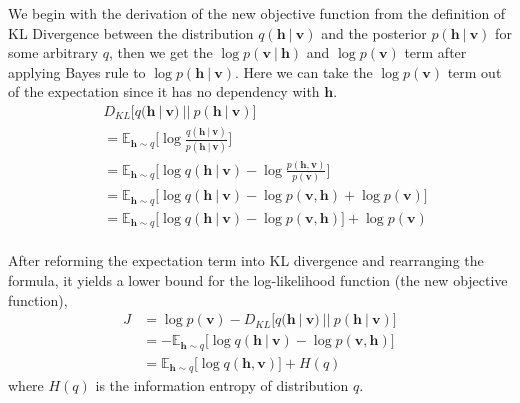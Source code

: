 \documentclass[conference]{IEEEtran}
\begin{document}
We begin with the derivation of the new objective function from the definition of KL Divergence between the distribution $q(\boldsymbol{h}\ |\ \boldsymbol{v})$ and the posterior $p(\boldsymbol{h}\ |\ \boldsymbol{v})$ for some arbitrary $q$, then we get the $\log p(\boldsymbol{v}\ |\ \boldsymbol{h})$ and $\log p(\boldsymbol{v})$ term after applying Bayes rule to $\log p(\boldsymbol{h}\ |\ \boldsymbol{v})$. Here we can take the $\log p(\boldsymbol{v})$ term out of the expectation since it has no dependency with $\boldsymbol{h}$.\\
\begin{equation}
  \begin{split}
  	& D_{KL}\bigg[q(\boldsymbol{h}\ |\ \boldsymbol{v})\ ||\ p(\boldsymbol{h}\ |\ \boldsymbol{v})\bigg] \\
  	& = \mathbb{E}_{\boldsymbol{h}\sim q}\bigg[\log \frac{q(\boldsymbol{h}\ |\ \boldsymbol{v})}{p(\boldsymbol{h}\ |\ \boldsymbol{v})}\bigg]\\
  	& = \mathbb{E}_{\boldsymbol{h}\sim q}\bigg[\log q(\boldsymbol{h}\ |\ \boldsymbol{v}) - \log \frac{p(\boldsymbol{h}, \boldsymbol{v})}{p(\boldsymbol{v})}\bigg]\\
    & = \mathbb{E}_{\boldsymbol{h}\sim q}\bigg[\log q(\boldsymbol{h}\ |\ \boldsymbol{v}) - \log p(\boldsymbol{v}, \boldsymbol{h}) + \log p(\boldsymbol{v})\bigg]\\
    & = \mathbb{E}_{\boldsymbol{h}\sim q}\bigg[\log q(\boldsymbol{h}\ |\ \boldsymbol{v}) - \log p(\boldsymbol{v}, \boldsymbol{h})\bigg] + \log p(\boldsymbol{v})\\
  \end{split}  
\end{equation}

After reforming the expectation term into KL divergence and rearranging the formula, it yields a lower bound for the log-likelihood function (the new objective function),
\begin{equation}
  \begin{split}
	J &= \log p(\boldsymbol{v}) - D_{KL}\bigg[q(\boldsymbol{h}\ |\ \boldsymbol{v})\ ||\ p(\boldsymbol{h}\ |\ \boldsymbol{v})\bigg]\\
  &=-\mathbb{E}_{\boldsymbol{h}\sim q}\bigg[\log q(\boldsymbol{h}\ |\ \boldsymbol{v}) - \log p(\boldsymbol{v}, \boldsymbol{h})\bigg]\\
  &=\mathbb{E}_{\boldsymbol{h}\sim q}\bigg[\log q(\boldsymbol{h},\boldsymbol{v})\bigg] + H(q)
  \end{split}  
\end{equation}
where $H(q)$ is the information entropy of distribution $q$.
\end{document}

